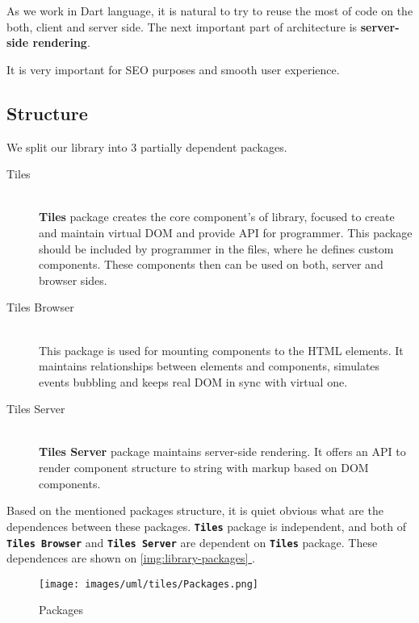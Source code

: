 \documentclass[oneside, 12pt]{book}
\newcommand*{\fullref}[1]{\hyperref[{#1}]{\autoref*{#1} \nameref*{#1}}}
\begin{document}
    As we work in Dart language, it is natural to try to reuse the most of code on the both, client and server side.
    The next important part of architecture is \textbf{server-side rendering}.

    It is very important for SEO purposes and smooth user experience. 

  \subsection{Structure}\label{subsec:our-architecture-structure}

    We split our library into 3 partially dependent packages. 
    \begin{description}
      \item[Tiles] \hfill \\
        \textbf{Tiles} package creates the core component's of library, focused to create and maintain virtual DOM and provide API for programmer.
        This package should be included by programmer in the files, where he defines custom components. 
        These components then can be used on both, server and browser sides.
      \item[Tiles Browser] \hfill \\
        This package is used for mounting components to the HTML elements. 
        It maintains relationships between elements and components, 
        simulates events bubbling and keeps real DOM in sync with virtual one.
      \item[Tiles Server] \hfill \\
        \textbf{Tiles Server} package maintains server-side rendering. It offers an API to render component structure to string with markup based on DOM components.
    \end{description}

    Based on the mentioned packages structure, it is quiet obvious what are the dependences between these packages.
    \texttt{\textbf{Tiles}} package is independent, 
		and both of \texttt{\textbf{Tiles Browser}} and \texttt{\textbf{Tiles Server}} are dependent on \texttt{\textbf{Tiles}} package.
    These dependences are shown on \fullref{img:library-packages}.

    \begin{figure}[h]
    \centering  
      \texttt{[image: images/uml/tiles/Packages.png]}
      \caption{Packages}
      \label{img:library-packages}
    \end{figure}
\end{document}
